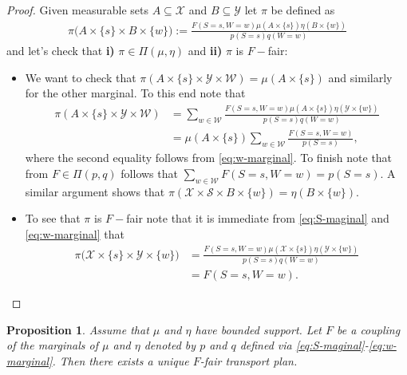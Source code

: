 \documentclass{article}
\newtheorem{prop}[thm]{Proposition}
\theoremstyle{definition}
\begin{document}
\begin{proof}
Given measurable sets $A\subseteq \mathcal{X}$ and $B\subseteq \mathcal{Y}$ let $\pi$ be defined as
\begin{align*}
    \pi\big(A\times \lbrace s\rbrace \times B\times \lbrace w\rbrace\big):=\frac{F(S=s,W=w)\mu(A\times \lbrace s\rbrace )\eta(B\times \lbrace w \rbrace )}{p(S=s)q(W=w)}
\end{align*}
and let's check that \textbf{i)} $\pi\in \Pi(\mu,\eta)$ and \textbf{ii)} $\pi$ is $F-$fair:
\begin{itemize}
    \item[i)] We want to check that $\pi(A\times \lbrace s\rbrace \times \mathcal{Y}\times \mathcal{W})=\mu(A\times \lbrace s\rbrace)$ and similarly for the other marginal. To this end note that 
    \begin{align*}
      \pi(A\times \lbrace s\rbrace \times \mathcal{Y}\times \mathcal{W})&= \sum_{w\in \mathcal{W}}\frac{F(S=s,W=w)\mu(A\times \lbrace s\rbrace )\eta(\mathcal{Y}\times \lbrace w \rbrace )}{p(S=s)q(W=w)}\\
      &=\mu(A\times \lbrace s\rbrace )\sum_{w\in \mathcal{W}}\frac{F(S=s,W=w)}{p(S=s)},
    \end{align*}
    where the second equality follows from \eqref{eq:w-marginal}. To finish note that from $F\in \Pi(p,q)$  follows that $\sum_{w\in \mathcal{W}} F(S=s,W=w)=p(S=s)$. A similar argument shows that $\pi(\mathcal{X}\times \mathcal{S} \times B\times \lbrace w\rbrace )=\eta(B\times \lbrace w\rbrace)$.
    \item[ii)] To see that $\pi$ is $F-$fair note that it is immediate from \eqref{eq:S-maginal} and \eqref{eq:w-marginal} that 
    \begin{align*}
        \pi\big(\mathcal{\mathcal{X}}\times \lbrace s \rbrace \times \mathcal{\mathcal{Y}}\times \lbrace w \rbrace\big)&=\frac{F(S=s,W=w)\mu(\mathcal{X}\times \lbrace s\rbrace )\eta(\mathcal{Y}\times \lbrace w \rbrace )}{p(S=s)q(W=w)}\\
        &=F(S=s,W=w).
    \end{align*}
\end{itemize}
\end{proof}
\begin{prop}
    Assume that $\mu$ and $\eta$ have bounded support. Let $F$ be a coupling of the marginals of $\mu$ and $\eta$ denoted by $p$ and $q$ defined via \eqref{eq:S-maginal}-\eqref{eq:w-marginal}.  Then there exists a unique $F$-fair transport plan.
\end{prop}
\end{document}

